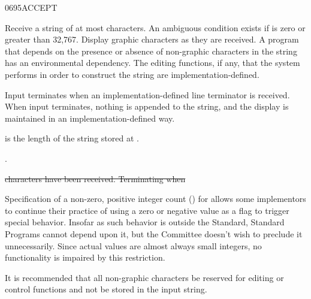\begin{worddef}{0695}{ACCEPT}
\item {}

	Receive a string of at most  characters. An ambiguous
	condition exists if  is zero or greater than 32,767.
	Display graphic characters as they are received. A program that
	depends on the presence or absence of non-graphic characters in the
	string has an environmental dependency. The editing functions, if
	any, that the system performs in order to construct the string are
	implementation-defined.

	Input terminates when an implementation-defined line terminator is
	received. When input terminates, nothing is appended to the string,
	and the display is maintained in an implementation-defined way.

	 is the length of the string stored at .

\see {}.

	\begin{rationale} %
		 \sout{characters have been received. Terminating when}
		 

		Specification of a non-zero, positive integer count ()
		for  allows some implementors to continue their
		practice of using a zero or negative value as a flag to trigger
		special behavior. Insofar as such behavior is outside the
		Standard, Standard Programs cannot depend upon it, but the
		 Committee doesn't wish to preclude it unnecessarily.
		Since actual values are almost always small integers, no
		functionality is impaired by this restriction.

		It is recommended that all non-graphic characters be reserved
		for editing or control functions and not be stored in the input
		string.


\end{rationale}
\end{worddef}
